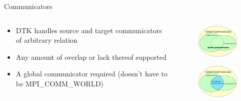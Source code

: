 \documentclass{beamer}
\begin{document}
\begin{frame}{Communicators}

  \begin{columns}
    
    \begin{column}{0.5\textwidth}
      \begin{itemize}
      \item DTK handles source and target communicators of arbitrary
        relation 
        \bigskip
      \item Any amount of overlap or lack thereof supported
        \bigskip
      \item A global communicator required (doesn't have to be
        MPI\_COMM\_WORLD) 
      \end{itemize}
    \end{column}

    \begin{column}{0.5\textwidth}
      \begin{figure}[htpb!]
        \centering \includegraphics[width=1.7in]{union_comm.pdf}
      \end{figure}

      \begin{figure}[htpb!]
        \centering \includegraphics[width=1.7in]{intersection_comm.pdf}
      \end{figure}
    \end{column}

  \end{columns}

\end{frame}
\end{document}

